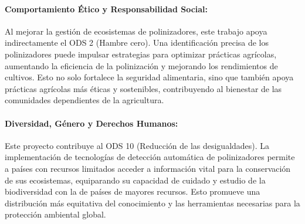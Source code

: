 \paragraph{Comportamiento Ético y Responsabilidad Social:} Al mejorar la gestión de ecosistemas de polinizadores, este trabajo apoya indirectamente el ODS 2 (Hambre cero). Una identificación precisa de los polinizadores puede impulsar estrategias para optimizar prácticas agrícolas, aumentando la eficiencia de la polinización y mejorando los rendimientos de cultivos. Esto no solo fortalece la seguridad alimentaria, sino que también apoya prácticas agrícolas más éticas y sostenibles, contribuyendo al bienestar de las comunidades dependientes de la agricultura.

\paragraph{Diversidad, Género y Derechos Humanos:} Este proyecto contribuye al ODS 10 (Reducción de las desigualdades). La implementación de tecnologías de detección automática de polinizadores permite a países con recursos limitados acceder a información vital para la conservación de sus ecosistemas, equiparando su capacidad de cuidado y estudio de la biodiversidad con la de países de mayores recursos. Esto promueve una distribución más equitativa del conocimiento y las herramientas necesarias para la protección ambiental global.